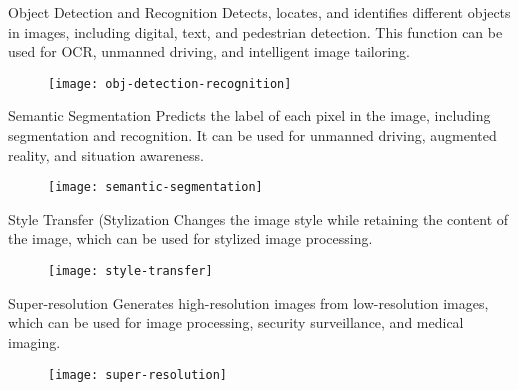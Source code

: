 
\begin{frame}{Object Detection and Recognition}
Detects, locates, and identifies different objects in images, including
digital, text, and pedestrian detection. This function can be used for
OCR, unmanned driving, and intelligent image tailoring.
\begin{figure}[!]
\centering
\texttt{[image: obj-detection-recognition]}
\end{figure}
\end{frame}


\begin{frame}{Semantic Segmentation}
Predicts the label of each pixel in the image, including segmentation
and recognition. It can be used for unmanned driving, augmented
reality, and situation awareness.
\begin{figure}[!]
\centering
\texttt{[image: semantic-segmentation]}
\end{figure}
\end{frame}


\begin{frame}{Style Transfer (Stylization}
Changes the image style while retaining the content of the
image, which can be used for stylized image processing.
\begin{figure}[!]
\centering
\texttt{[image: style-transfer]}
\end{figure}
\end{frame}


\begin{frame}{Super-resolution}
Generates high-resolution images from low-resolution images, which can be
used for image processing, security surveillance, and medical imaging.
\begin{figure}[!]
\centering
\texttt{[image: super-resolution]}
\end{figure}
\end{frame}


